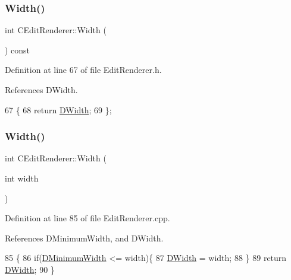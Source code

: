 \subsubsection{\texorpdfstring{Width()}{Width()}\hspace{0.1cm}{\footnotesize\ttfamily [1/2]}}
{\footnotesize\ttfamily int C\+Edit\+Renderer\+::\+Width (\begin{DoxyParamCaption}{ }\end{DoxyParamCaption}) const\hspace{0.3cm}{\ttfamily [inline]}}



Definition at line 67 of file Edit\+Renderer.\+h.



References D\+Width.


\begin{DoxyCode}
67                          \{
68             \textcolor{keywordflow}{return} \hyperlink{classCEditRenderer_ab203e5083f61d3575eb491f170c21d45}{DWidth};
69         \};
\end{DoxyCode}
\hypertarget{classCEditRenderer_a9b9e7e4fa7e7c2ef8c8b4bd09c4122ac}{}\label{classCEditRenderer_a9b9e7e4fa7e7c2ef8c8b4bd09c4122ac} 
\subsubsection{\texorpdfstring{Width()}{Width()}\hspace{0.1cm}{\footnotesize\ttfamily [2/2]}}
{\footnotesize\ttfamily int C\+Edit\+Renderer\+::\+Width (\begin{DoxyParamCaption}\item[{int}]{width }\end{DoxyParamCaption})}



Definition at line 85 of file Edit\+Renderer.\+cpp.



References D\+Minimum\+Width, and D\+Width.


\begin{DoxyCode}
85                                  \{
86     \textcolor{keywordflow}{if}(\hyperlink{classCEditRenderer_aba068f1e6d267e5ac0ed5752304133e8}{DMinimumWidth} <= width)\{
87         \hyperlink{classCEditRenderer_ab203e5083f61d3575eb491f170c21d45}{DWidth} = width;   
88     \}
89     \textcolor{keywordflow}{return} \hyperlink{classCEditRenderer_ab203e5083f61d3575eb491f170c21d45}{DWidth};
90 \}
\end{DoxyCode}


